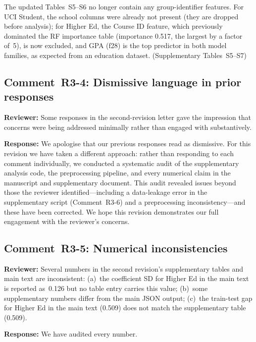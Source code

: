 \documentclass[10pt,letterpaper]{article}
\begin{document}
The updated Tables~S5--S6 no longer contain any group-identifier features.
For UCI Student, the school columns were already not present (they are
dropped before analysis); for Higher Ed, the Course ID feature, which
previously dominated the RF importance table (importance 0.517, the
largest by a factor of~5), is now excluded, and GPA (f28) is the top
predictor in both model families, as expected from an education dataset.
(Supplementary Tables~S5--S7)

\subsection*{Comment~R3-4: Dismissive language in prior responses}

\textbf{Reviewer:} Some responses in the second-revision letter gave the
impression that concerns were being addressed minimally rather than
engaged with substantively.

\textbf{Response:} We apologise that our previous responses read as
dismissive.  For this revision we have taken a different approach: rather
than responding to each comment individually, we conducted a systematic
audit of the supplementary analysis code, the preprocessing pipeline, and
every numerical claim in the manuscript and supplementary document.  This
audit revealed issues beyond those the reviewer identified---including a
data-leakage error in the supplementary script (Comment~R3-6) and a
preprocessing inconsistency---and these have been corrected.  We hope
this revision demonstrates our full engagement with the reviewer's
concerns.

\subsection*{Comment~R3-5: Numerical inconsistencies}

\textbf{Reviewer:} Several numbers in the second revision's supplementary
tables and main text are inconsistent: (a)~the coefficient SD for Higher
Ed in the main text is reported as~0.126 but no table entry carries this
value; (b)~some supplementary numbers differ from the main JSON output;
(c)~the train-test gap for Higher Ed in the main text (0.509) does not
match the supplementary table (0.509).

\textbf{Response:} We have audited every number.
\end{document}
